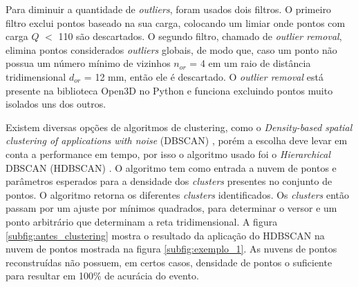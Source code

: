 \documentclass[a4paper,12pt,oneside]{book}
\begin{document}
\par Para diminuir a quantidade de \textit{outliers}, foram usados dois filtros. O primeiro filtro exclui pontos baseado na sua carga, colocando um limiar onde pontos com carga $Q$ $<$ 110 são descartados. O segundo filtro, chamado de \textit{outlier removal}, elimina pontos considerados \textit{outliers} globais, de modo que, caso um ponto não possua um número mínimo de vizinhos $n_{or}$ = 4 em um raio de distância tridimensional $d_{or}$ = 12 mm, então ele é descartado. O \textit{outlier removal} está presente na biblioteca Open3D\cite{open3d} no Python e funciona excluindo pontos muito isolados uns dos outros.

\par Existem diversas opções de algoritmos de clustering, como o \textit{Density-based spatial clustering of applications with noise} (DBSCAN) \cite{dbscan}, porém a escolha deve levar em conta a performance em tempo, por isso o algoritmo usado foi o \textit{Hierarchical} DBSCAN (HDBSCAN) \cite{hdbscan1, hdbscan2}. O algoritmo tem como entrada a nuvem de pontos e parâmetros esperados para a densidade dos \textit{clusters} presentes no conjunto de pontos. O algoritmo retorna os diferentes \textit{clusters} identificados. Os \textit{clusters} então passam por um ajuste por mínimos quadrados, para determinar o versor e um ponto arbitrário que determinam a reta tridimensional. A figura \ref{subfig:antes_clustering} mostra o resultado da aplicação do HDBSCAN na nuvem de pontos mostrada na figura \ref{subfig:exemplo_1}. As nuvens de pontos reconstruídas não possuem, em certos casos, densidade de pontos o suficiente para resultar em 100\% de acurácia do evento.
\end{document}
